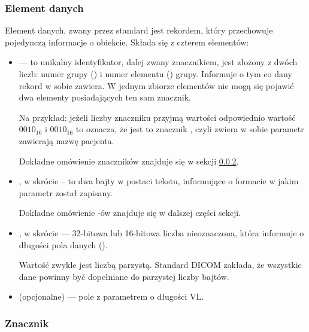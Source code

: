 \subsubsection{Element danych}

Element danych, zwany przez standard \DICOM {} jest rekordem, który przechowuje pojedynczą informacje o obiekcie.
Składa się z czterem elementów:

\begin{itemize}

    \item {} --- to unikalny identyfikator, dalej zwany znacznikiem, jest złożony z dwóch liczb: numer grupy () i numer elementu () grupy.
          Informuje o tym co dany rekord w sobie zawiera.
          W jednym zbiorze elementów nie mogą się pojawić dwa elementy posiadających ten sam znacznik.

          Na przykład: jeżeli liczby znaczniku przyjmą wartości odpowiednio wartość $0010_{16}$ i $0010_{16}$ to oznacza, że jest to znacznik , czyli zwiera w sobie parametr zawierają nazwę pacjenta.

          Dokładne omówienie znaczników znajduje się w sekcji \ref{sec:dicom-tag}.

    \item {}, w skrócie  – to dwa bajty w postaci tekstu, informujące o formacie w jakim parametr został zapisany.

          Dokładne omówienie -ów znajduje się w dalszej części sekcji.

    \item {}, w skrócie  --- 32-bitowa lub 16-bitowa liczba nieoznaczona, która informuje o długości pola danych ().

          Wartość  zwykle jest liczbą parzystą.
          Standard DICOM zakłada, że wszystkie dane powinny być dopełniane do parzystej liczby bajtów.

    \item {} (opcjonalne) --- pole z parametrem o długości VL.

\end{itemize}

\subsubsection{Znacznik}
\label{sec:dicom-tag}

